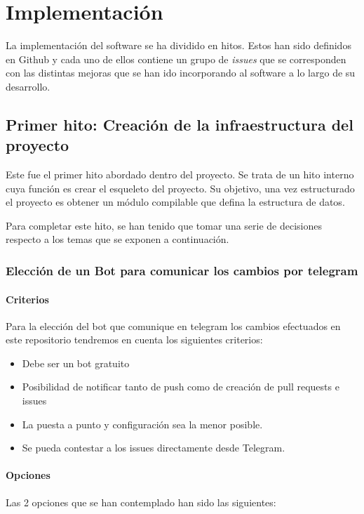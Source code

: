 \chapter{Implementación}

La implementación del software se ha dividido en hitos. Estos han sido definidos en Github
y cada uno de ellos contiene un grupo de \textit{issues} que se corresponden con las distintas
mejoras que se han ido incorporando al software a lo largo de su desarrollo.\\

\section{Primer hito: Creación de la infraestructura del proyecto}

Este fue el primer hito abordado dentro del proyecto. Se trata de un hito interno cuya función es crear el esqueleto del proyecto.
Su objetivo, una vez estructurado el proyecto es obtener un módulo compilable que defina la estructura de datos.

Para completar este hito, se han tenido que tomar una serie de decisiones respecto a los temas que se exponen a continuación.
\newpage

\subsection{Elección de un Bot para comunicar los cambios por telegram}

\subsubsection{Criterios}
Para la elección del bot que comunique en telegram los cambios
efectuados en este repositorio tendremos en cuenta los siguientes
criterios:

\begin{itemize}
    \item Debe ser un bot gratuito
    \item Posibilidad de notificar tanto
de push como de creación de pull requests e issues
    \item La puesta a punto
y configuración sea la menor posible.
    \item Se pueda contestar a los issues
directamente desde Telegram.
\end{itemize}

\subsubsection{Opciones}
Las 2 opciones que se han contemplado han sido las siguientes:\\


